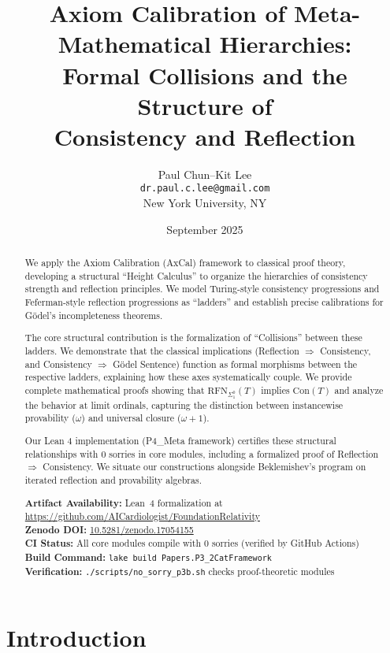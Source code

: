 \documentclass[11pt]{article}
\title{Axiom Calibration of Meta-Mathematical Hierarchies:\\
Formal Collisions and the Structure of\\
Consistency and Reflection}
\author{Paul Chun--Kit Lee\\
\texttt{dr.paul.c.lee@gmail.com}\\
New York University, NY}
\date{September 2025}
\newcommand{\Con}{\mathrm{Con}}
\newcommand{\RFNSigOne}{\mathrm{RFN}_{\Sigma^0_1}}
\begin{document}
\maketitle

\begin{abstract}
We apply the Axiom Calibration (AxCal) framework to classical proof theory, developing a structural ``Height Calculus'' to organize the hierarchies of consistency strength and reflection principles. We model Turing-style consistency progressions and Feferman-style reflection progressions as ``ladders'' and establish precise calibrations for Gödel's incompleteness theorems.

The core structural contribution is the formalization of ``Collisions'' between these ladders. We demonstrate that the classical implications (Reflection $\Rightarrow$ Consistency, and Consistency $\Rightarrow$ Gödel Sentence) function as formal morphisms between the respective ladders, explaining how these axes systematically couple. We provide complete mathematical proofs showing that $\RFNSigOne(T)$ implies $\Con(T)$ and analyze the behavior at limit ordinals, capturing the distinction between instancewise provability ($\omega$) and universal closure ($\omega+1$).

Our Lean 4 implementation (P4\_Meta framework) certifies these structural relationships with 0 sorries in core modules, including a formalized proof of Reflection $\Rightarrow$ Consistency. We situate our constructions alongside Beklemishev's program on iterated reflection and provability algebras.

\vspace{1em}
\noindent\textbf{Artifact Availability:} Lean~4 formalization at \url{https://github.com/AICardiologist/FoundationRelativity}\\
\textbf{Zenodo DOI:} \href{https://doi.org/10.5281/zenodo.17054155}{10.5281/zenodo.17054155}\\
\textbf{CI Status:} All core modules compile with 0 sorries (verified by GitHub Actions)\\
\textbf{Build Command:} \texttt{lake build Papers.P3\_2CatFramework}\\
\textbf{Verification:} \texttt{./scripts/no\_sorry\_p3b.sh} checks proof-theoretic modules
\end{abstract}

\tableofcontents

\section{Introduction}
\end{document}
